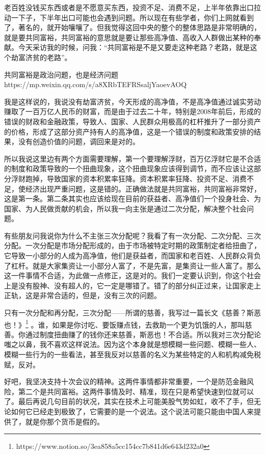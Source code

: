 \documentclass[UTF8, 12pt, a4paper]{ctexrep}
\begin{document}
老百姓没钱买东西或者是不愿意买东西，投资不足、消费不足，上半年依靠出口拉动一下子，下半年出口可能也会遇到问题。所以现在有些学者，你们上网就看到了，著名的，就开始嚷嚷了。但我觉得这回中央的整个的整体思路是非常明确的，就是要共同富裕，共同富裕的意思就是要让那些高净值、高收入人群做出某种的奉献。今天采访我的时候，问我：“共同富裕是不是又要走这种老路？老路，就是这个劫富济贫的老路”。

共同富裕是政治问题，也是经济问题 https://mp.weixin.qq.com/s/a8XRbTEFRSsaljYaoevAOQ

我是这样说的，我说没有劫富济贫，今天形成的高净值，不是高净值通过诚实劳动赚取了一百万亿人民币的财富，而是由于过去二十年，特别是2008年前后，形成的错误的财政和金融政策，导致人、国家、人民群众用极高的杠杆推升了一部分资产的价格，形成了这部分资产持有人的高净值，这是一个错误的制度和政策安排的结果，没有创造价值的问题，调回来是对的。

所以我说这里边有两个方面需要理解，第一个要理解浮财，百万亿浮财它是不合适的制度和政策导致的一个扭曲现象，这个扭曲现象应该得到调节，而不应该让这部分浮财跑掉，导致国家的资本积累率狂降。资本积累率狂降、投资不足、消费不足，使经济出现严重问题，这是错的。正确做法就是共同富裕，共同富裕非常好，这是第一条。第二条其实也应该给现在目前的获益者、高净值们一个投身社会、为国家、为人民做贡献的机会，所以我一向主张是通过二次分配，解决整个社会问题。

有些朋友问我说你为什么不主张三次分配呢？我看了有一次分配、二次分配、三次分配。一次分配是市场分配形成的，由于市场被特定时期的政策制定者给扭曲了，它导致一小部分的人成为高净值，他们是获益者，而国家和老百姓、人民群众背负了杠杆。就是大家集资让一小部分人富了，不是先富，是集资让一些人富了。那么这一件事情不合适，为此做一点修正，这是对的。我们一定要认识到，你这个社会上是没有股神、没有超人的，它一定是哪错了。错了的部分纠正过来，让国家走上正轨，这是非常合适的，但是，没有三次的问题。

只有一次分配和再分配，三次分配——所谓的慈善，我写过一篇长文《慈善？斯恶也！》\footnote{https://www.notion.so/3ea858a5cc154cc7b841d6e643d232a0} 。谁，如果是你讨吃、要饭赚点钱，去救助一个更为饥饿的人，那叫慈善。你通过制度扭曲赚了的钱你还来慈善，斯恶也！不合适。所以我对三次分配论嗤之以鼻，我不喜欢这样说法。因为这个本身就是想模糊一些问题、模糊一些人、模糊一些行为的一些看法，甚至我反对以慈善的名义为某些特定的人和机构减免税赋，反对。

好吧，我坚决支持十次会议的精神。这两件事情都非常重要，一个是防范金融风险，第二个是共同富裕。这两件事情及时、精准，现在只是希望快速到位就可以了。最后再说几句目前的状况，其实在技术上可能美股气势如虹，收不了手，但无论如何它已经走到极致了，它需要的是一个说法。这个说法可能只能由中国人来提供了，就是你那个货币是假的。
\end{document}
